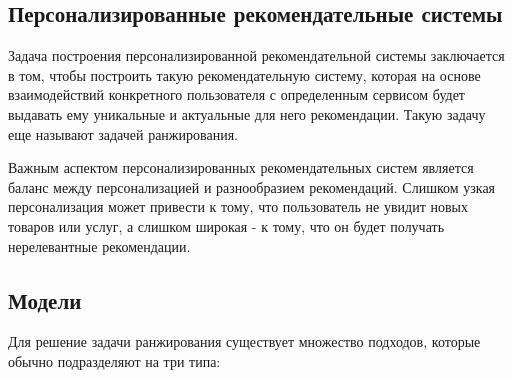 \documentclass[bachelor, och, coursework]{SCWorks}
\begin{document}
\subsection{Персонализированные рекомендательные системы}
Задача построения персонализированной рекомендательной системы заключается в том, чтобы построить такую рекомендательную
систему, которая на основе взаимодействий конкретного пользователя с определенным сервисом будет выдавать ему
уникальные и актуальные для него рекомендации. Такую задачу еще называют задачей ранжирования.

Важным аспектом персонализированных рекомендательных систем является баланс между персонализацией и разнообразием рекомендаций.
Слишком узкая персонализация может привести к тому, что пользователь не увидит новых товаров или услуг, а слишком широкая - к тому,
что он будет получать нерелевантные рекомендации.
\subsection{Модели}
Для решение задачи ранжирования существует множество подходов, которые обычно подразделяют на три типа:
\end{document}
